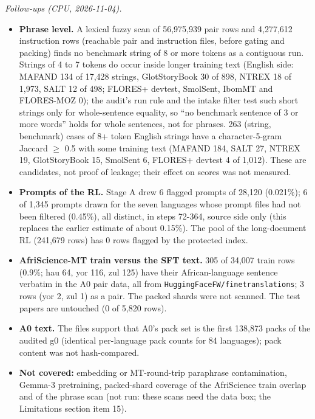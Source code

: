 \emph{Follow-ups (CPU, 2026-11-04).} 

\begin{itemize}
\item \textbf{Phrase level.} A lexical fuzzy scan of 56,975,939 pair rows and 4,277,612 instruction rows (reachable pair and instruction files, before gating and packing) finds no benchmark string of 8 or more tokens as a contiguous run. Strings of 4 to 7 tokens do occur inside longer training text (English side: MAFAND 134 of 17,428 strings, GlotStoryBook 30 of 898, NTREX 18 of 1,973, SALT 12 of 498; FLORES+ devtest, SmolSent, IbomMT and FLORES-MOZ 0); the audit's run rule and the intake filter test such short strings only for whole-sentence equality, so ``no benchmark sentence of 3 or more words'' holds for whole sentences, not for phrases. 263 (string, benchmark) cases of 8+ token English strings have a character-5-gram Jaccard $\ge$ 0.5 with some training text (MAFAND 184, SALT 27, NTREX 19, GlotStoryBook 15, SmolSent 6, FLORES+ devtest 4 of 1,012). These are candidates, not proof of leakage; their effect on scores was not measured.
\item \textbf{Prompts of the RL.} Stage A drew 6 flagged prompts of 28,120 (0.021\%); 6 of 1,345 prompts drawn for the seven languages whose prompt files had not been filtered (0.45\%), all distinct, in steps 72-364, source side only (this replaces the earlier estimate of about 0.15\%). The pool of the long-document RL (241,679 rows) has 0 rows flagged by the protected index.
\item \textbf{AfriScience-MT train versus the SFT text.} 305 of 34,007 train rows (0.9\%; hau 64, yor 116, zul 125) have their African-language sentence verbatim in the A0 pair data, all from \texttt{HuggingFaceFW/\allowbreak{}finetranslations}; 3 rows (yor 2, zul 1) as a pair. The packed shards were not scanned. The test papers are untouched (0 of 5,820 rows).
\item \textbf{A0 text.} The files support that A0's pack set is the first 138,873 packs of the audited g0 (identical per-language pack counts for 84 languages); pack content was not hash-compared.
\item \textbf{Not covered:} embedding or MT-round-trip paraphrase contamination, Gemma-3 pretraining, packed-shard coverage of the AfriScience train overlap and of the phrase scan (not run: these scans need the data box; the Limitations section item 15).
\end{itemize}

